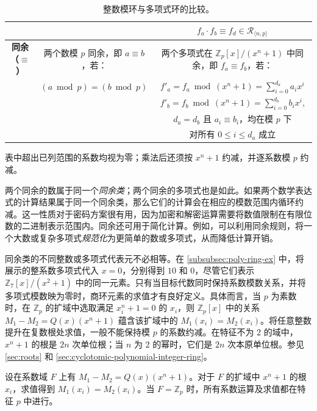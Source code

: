 \begin{table}[h]
\begin{tabular}{|c||c|c|}
&&$f_a \cdot f_b \equiv f_d \in \mathcal{R}_{\langle n, p \rangle}$\\
\hline
\textbf{{同余（$\equiv$）}} & 两个数模 $p$ 同余，即 $a \equiv b$，若： & 两个多项式在 $\mathbb{Z}_p[x] / (x^n + 1)$ 中同余，即 $f_a \equiv f_b$，若：\\
 & $(a \bmod p) = (b \bmod p)$   & $f'_a = f_a \bmod (x^n + 1) = \sum\limits_{i=0}^{d_a} a_ix^i$ \\
 & & $f'_b = f_b \bmod (x^n + 1) = \sum\limits_{i=0}^{d_b} b_ix^i$, \\
&& $d_a = d_b$ 且 $a_i \equiv b_i$，均在模 $p$ 下\\
&&对所有 $0 \leq i \leq d_a$ 成立\\
\hline
\end{tabular}%
\centering
\caption{整数模环与多项式环的比较。
}
\label{tab:ring-comparison}

表中超出已列范围的系数均视为零；乘法后还须按 $x^n+1$ 约减，并逐系数模 $p$ 约减。
\end{table}

两个同余的数属于同一个\textit{同余类}；两个同余的多项式也是如此。如果两个数学表达式的计算结果属于同一个同余类，那么它们的计算会在相应的模数范围内循环约减。这一性质对于密码方案很有用，因为加密和解密运算需要将数值限制在有限位数的二进制表示范围内。同余还可用于简化计算。例如，可以利用同余规则，将一个大数或复杂多项式\textit{规范化}为更简单的数或多项式，从而降低计算开销。

同余类的不同整数或多项式代表元不必相等。在 \autoref{subsubsec:poly-ring-ex} 中，将展示的整系数多项式代入 $x=0$，分别得到 $10$ 和 $0$，尽管它们表示 $\mathbb{Z}_7[x]/(x^2+1)$ 中的同一元素。只有当目标代数同时保持系数模数关系，并将多项式模数映为零时，商环元素的求值才有良好定义。具体而言，当 $p$ 为素数时，在 $\mathbb{Z}_p$ 的扩域中选取满足 $x_i^n+1=0$ 的 $x_i$，则 $\mathbb{Z}_p[x]$ 中的关系 $M_1-M_2=Q(x)(x^n+1)$ 蕴含该扩域中的 $M_1(x_i)=M_2(x_i)$。将任意整数提升在复数根处求值，一般不能保持模 $p$ 的系数约减。在特征不为 $2$ 的域中，$x^n+1$ 的根是 $2n$ 次单位根；当 $n$ 为 $2$ 的幂时，它们是 $2n$ 次本原单位根。参见 \autoref{sec:roots} 和 \autoref{sec:cyclotomic-polynomial-integer-ring}。

\begin{tcolorbox}[title={\textbf{\tboxlabel{\ref*{subsubsec:polynomial-ring-discuss}} 多项式环中的多项式求值}}]

设在系数域 $F$ 上有 $M_1-M_2=Q(x)(x^n+1)$。对于 $F$ 的扩域中 $x^n+1$ 的根 $x_i$，求值得到 $M_1(x_i)=M_2(x_i)$。当 $F=\mathbb{Z}_p$ 时，所有系数运算及求值都在特征 $p$ 中进行。

\end{tcolorbox}

